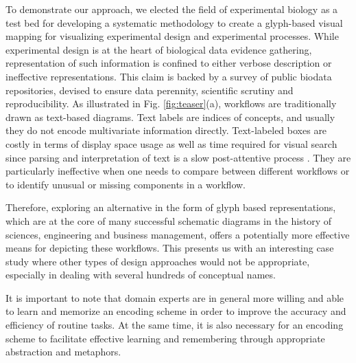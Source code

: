 To demonstrate our approach, we elected the field of experimental biology as a test bed for developing a systematic methodology to create a glyph-based visual mapping for visualizing experimental design and experimental processes. While experimental design is at the heart of biological data evidence gathering, representation of such information is confined to either verbose description or ineffective representations. This claim is backed by a survey of public biodata repositories, devised to ensure data perennity, scientific scrutiny and reproducibility. As illustrated in Fig. \ref{fig:teaser}(a), workflows are traditionally drawn as text-based diagrams. Text labels are indices of concepts, and usually they do not encode multivariate information directly. Text-labeled boxes are costly in terms of display space usage as well as time required for visual search since parsing and interpretation of text is a slow post-attentive process \cite{ware04}. They are particularly ineffective when one needs to compare between different workflows or to identify unusual or missing components in a workflow.

Therefore, exploring an alternative in the form of glyph based representations, which are at the core of many successful schematic diagrams in the history of sciences, engineering and business management, offers a potentially more effective means for depicting these workflows.  
This presents us with an interesting case study where other types of design approaches would not be appropriate, especially in dealing with several hundreds of conceptual names.

It is important to note that domain experts are in general more willing and able to learn and memorize an encoding scheme in order to improve the accuracy and efficiency of routine tasks. At the same time, it is also necessary for an encoding scheme to facilitate effective learning and remembering through appropriate abstraction and metaphors.

